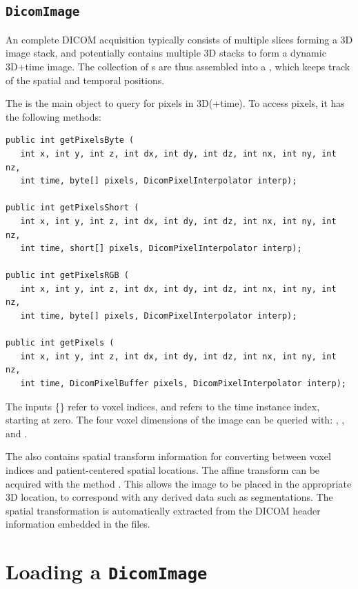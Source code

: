 \subsection{\texttt{DicomImage}}

An complete DICOM acquisition typically consists of multiple slices forming a 3D image stack,
and potentially contains multiple 3D stacks to form a dynamic 3D+time image.  The collection
of s are thus assembled into a , 
which keeps track of the spatial and temporal positions.

The  is the main object to query for pixels in 3D(+time).  To access pixels,
it has the following methods:
\begin{lstlisting}[]
public int getPixelsByte (
   int x, int y, int z, int dx, int dy, int dz, int nx, int ny, int nz, 
   int time, byte[] pixels, DicomPixelInterpolator interp);

public int getPixelsShort (
   int x, int y, int z, int dx, int dy, int dz, int nx, int ny, int nz, 
   int time, short[] pixels, DicomPixelInterpolator interp);

public int getPixelsRGB (
   int x, int y, int z, int dx, int dy, int dz, int nx, int ny, int nz, 
   int time, byte[] pixels, DicomPixelInterpolator interp);

public int getPixels (
   int x, int y, int z, int dx, int dy, int dz, int nx, int ny, int nz, 
   int time, DicomPixelBuffer pixels, DicomPixelInterpolator interp);
\end{lstlisting}
The inputs \{\} refer to voxel indices, and  refers to the time instance index, starting at zero.  The four voxel dimensions of the image can be queried with:  , , and .

The  also contains spatial transform information for converting between voxel indices and patient-centered spatial locations.  The affine transform can be acquired with the method .  This allows the image to be placed in the appropriate 3D location, to correspond with any derived data such as segmentations.  The spatial transformation is automatically extracted from the DICOM header information embedded in the files.

\section{Loading a \texttt{DicomImage} \label{sec:dicom:loading}}

